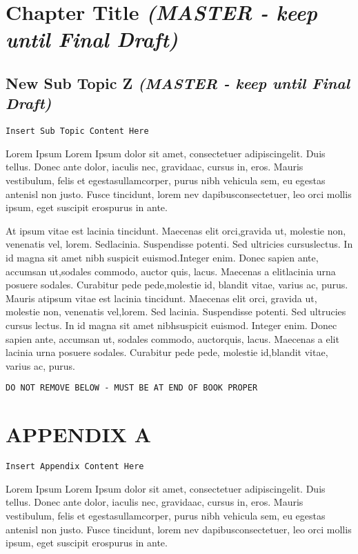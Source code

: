 \documentclass[openleft,oneside,showtrims]{memoir}
\begin{document}
\chapter{Chapter Title \emph{(MASTER - keep until Final Draft)}}
\label{sec:orge5bb01d}
\label{CHAPTER_chapter-title}
\section{New Sub Topic Z \emph{(MASTER - keep until Final Draft)}}
\label{sec:org3dc19bf}
\label{TOPIC_new-sub-topic-z}
\texttt{Insert Sub Topic Content Here}

Lorem Ipsum Lorem Ipsum dolor sit amet, consectetuer adipiscingelit. Duis tellus. Donec ante dolor, iaculis nec, gravidaac, cursus in, eros. Mauris vestibulum, felis et egestasullamcorper, purus nibh vehicula sem, eu egestas antenisl non justo. Fusce tincidunt, lorem nev dapibusconsectetuer, leo orci mollis ipsum, eget suscipit erospurus in ante.

At ipsum vitae est lacinia tincidunt. Maecenas elit orci,gravida ut, molestie non, venenatis vel, lorem. Sedlacinia. Suspendisse potenti. Sed ultricies cursuslectus. In id magna sit amet nibh suspicit euismod.Integer enim. Donec sapien ante, accumsan ut,sodales commodo, auctor quis, lacus. Maecenas a elitlacinia urna posuere sodales. Curabitur pede pede,molestie id, blandit vitae, varius ac, purus. Mauris atipsum vitae est lacinia tincidunt. Maecenas elit orci, gravida ut, molestie non, venenatis vel,lorem. Sed lacinia. Suspendisse potenti. Sed ultrucies cursus lectus. In id magna sit amet nibhsuspicit euismod. Integer enim. Donec sapien ante, accumsan ut, sodales commodo, auctorquis, lacus. Maecenas a elit lacinia urna posuere sodales. Curabitur pede pede, molestie id,blandit vitae, varius ac, purus.



\texttt{DO NOT REMOVE BELOW - MUST BE AT END OF BOOK PROPER}

\backmatter
\appendix

\chapter{APPENDIX A}
\label{sec:orgdfe9d9c}

\texttt{Insert Appendix Content Here}

Lorem Ipsum Lorem Ipsum dolor sit amet, consectetuer adipiscingelit. Duis tellus. Donec ante dolor, iaculis nec, gravidaac, cursus in, eros. Mauris vestibulum, felis et egestasullamcorper, purus nibh vehicula sem, eu egestas antenisl non justo. Fusce tincidunt, lorem nev dapibusconsectetuer, leo orci mollis ipsum, eget suscipit erospurus in ante.
\end{document}

